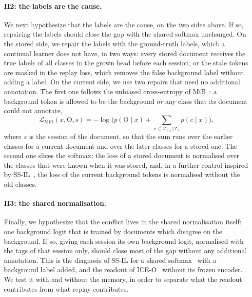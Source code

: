\paragraph{H2: the labels are the cause.} We next hypothesize that the labels are the cause,
on the two sides above. If so, repairing the labels should close the gap with the shared
softmax unchanged. On the stored side, we repair the labels with the ground-truth labels,
which a continual learner does not have, in two ways: every stored document receives the
true labels of all classes in the grown head before each session; or the stale tokens are
masked in the replay loss, which removes the false background label without adding a label.
On the current side, we use two repairs that need no additional annotation. The first one
follows the unbiased cross-entropy of MiB~\citep{cermelli2020mib}: a background token is
allowed to be the background \emph{or} any class that its document could not annotate,
\begin{equation}
  \mathcal{L}_{\mathrm{MiB}}(x,\mathrm{O},s)=-\log\Big(p(\mathrm{O}\mid x)
  +\sum_{c\,\in\,\mathcal{T}_{1:t}\setminus\mathcal{T}_s}p(c\mid x)\Big),
  \label{eq:mib}
\end{equation}
where $s$ is the session of the document, so that the sum runs over the earlier classes for
a current document and over the later classes for a stored one. The second one slices the
softmax: the loss of a stored document is normalised over the classes that were known when it
was stored, and, in a further control inspired by SS-IL~\citep{ahn2021ssil}, the loss of the
current background tokens is normalised without the old classes.

\paragraph{H3: the shared normalisation.} Finally, we hypothesize that the conflict lives in
the shared normalisation itself: one background logit that is trained by documents which
disagree on the background. If so, giving each session its own background logit, normalised
with the tags of that session only, should close most of the gap without any additional
annotation. This is the diagnosis of SS-IL for a shared softmax~\citep{ahn2021ssil} with a
background label added, and the readout of ICE-O~\citep{liu2023ice} without its frozen
encoder. We test it with and without the memory, in order to separate what the readout
contributes from what replay contributes.

